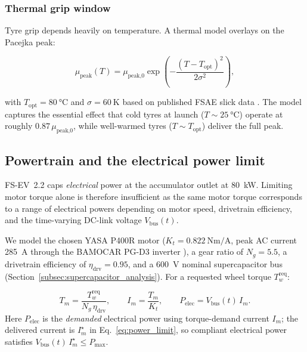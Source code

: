\documentclass[11pt, a4paper]{report}
\numberwithin{equation}{section}
\begin{document}
\begin{refsection}
\subsubsection*{Thermal grip window}
\label{sec:thermal}

Tyre grip depends heavily on temperature. A thermal model overlays on the
Pacejka peak:

\begin{equation}
\mu_\text{peak}(T) = \mu_\text{peak,0}
\exp\!\left(-\frac{(T - T_\text{opt})^2}{2 \sigma^2}\right),
\label{eq:thermal}
\end{equation}

with $T_\text{opt} = \SI{80}{\celsius}$ and
$\sigma = \SI{60}{\kelvin}$ based on published FSAE slick data
\cite{milliken1995}. The model captures the essential effect that
cold tyres at launch ($T \sim \SI{25}{\celsius}$) operate at roughly
$0.87\,\mu_\text{peak,0}$, while well-warmed tyres
($T \sim T_\text{opt}$) deliver the full peak.

\subsection{Powertrain and the electrical power limit}
\label{sec:powertrain}

FS-EV~2.2 caps \textit{electrical} power at the accumulator outlet at
\SI{80}{\kilo\watt}. Limiting
motor torque alone is therefore insufficient as the same motor torque
corresponds to a range of electrical powers depending on motor speed,
drivetrain efficiency, and the time-varying DC-link voltage $V_{\mathrm{bus}}(t)$.

We model the chosen YASA P400R motor
($K_t = \SI{0.822}{\newton\metre\per\ampere}$, peak AC current
\SI{285}{\ampere} through the BAMOCAR PG-D3 inverter
\cite{bamocar_pg, yasa_p400r}), a gear ratio of
$N_g = 5.5$, a drivetrain efficiency of $\eta_\text{drv} = 0.95$, and
a \SI{600}{\volt} nominal supercapacitor bus (Section~\ref{subsec:supercapacitor_analysis}). For a
requested wheel torque $T_w^\text{req}$:

\begin{equation}
T_m = \frac{T_w^\text{req}}{N_g \, \eta_\text{drv}},
\qquad
I_m = \frac{T_m}{K_t},
\qquad
P_\text{elec} = V_{\mathrm{bus}}(t)\, I_m.
\label{eq:powertrain_basic}
\end{equation}
Here $P_{\mathrm{elec}}$ is the \emph{demanded} electrical power using torque-demand current $I_m$; the delivered current is $I_m^{\star}$ in Eq.~\ref{eq:power_limit}, so compliant electrical power satisfies $V_{\mathrm{bus}}(t)\,I_m^{\star}\le P_{\max}$.


\end{refsection}
\end{document}
